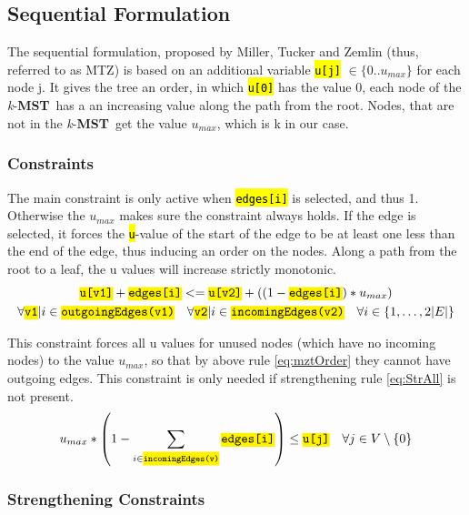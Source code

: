 \documentclass[,%
			paper=a4,%
			DIV14,
			liststotoc,
			bibtotoc,
			draft=false,%
			numbers=noendperiod
			]{scrartcl}
\newcommand{\mst}{\textbf{MST}}
\newcommand{\kmst}{\textit{k}-\mst}
\newcommand{\ilc}[1]{\hl{\texttt{#1}}} %
\newcommand{\vertex}{j}
\newcommand{\edge}{i}
\newcommand{\forallEdges}{\ensuremath{\forall \edge \in \{1, \dotsc, 2|E|\}}}
\begin{document}
\subsection{Sequential Formulation}
The sequential formulation, proposed by Miller, Tucker and Zemlin (thus, referred to as MTZ) is  based on an additional variable \ilc{u[\vertex]} $\in \{0..u_{max}\}$ for each node \vertex. It gives the tree an order, in which \ilc{u[0]} has the value 0, each node of the \kmst\ has a an increasing value along the path from the root. Nodes, that are not in the \kmst\ get the value $u_{max}$, which is k in our case.

\subsubsection{Constraints}
The main constraint is only active when \ilc{edges[\edge]} is selected, and thus 1. Otherwise the $u_{max}$ makes sure the constraint always holds. If the edge is selected, it forces the \ilc{u}-value of the start of the edge to be at least one less than the end of the edge, thus inducing an order on the nodes. Along a path from the root to a leaf, the u values will increase strictly monotonic.
	\begin{gather}
	\ilc{u[v1]} + \ilc{edges[\edge]} <= \ilc{u[v2]} + ( ( 1 - \ilc{edges[\edge]}) * u_{max} ) \nonumber \\
	\forall \ilc{v1}| \edge \in \ilc{outgoingEdges(v1)}
	\quad
	\forall \ilc{v2} | \edge \in \ilc{incomingEdges(v2)}
	\quad \forallEdges
\label{eq:mztOrder}
\end{gather}

This constraint forces all u values for unused nodes (which have no incoming nodes) to the value $u_{max}$, so that by above rule \eqref{eq:mztOrder} they cannot have outgoing edges. This constraint is only needed if strengthening rule \eqref{eq:StrAll} is not present.
\begin{equation}\label{eq:mztUnused}
 u_{max}*\left(1 - \sum_{ i \in \ilc{incomingEdges(v)}} \ilc{edges[i]} \right) \leq \ilc{u[\vertex]}
 \quad \forall \vertex \in V  \setminus \{0\}
\end{equation}

\subsubsection{Strengthening Constraints}
\end{document}
